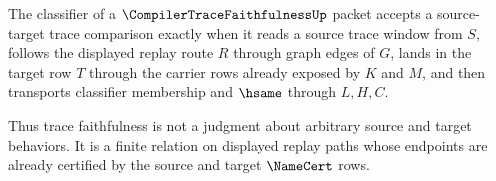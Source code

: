 \begin{definition}
\label{def:compiler-trace-faithfulness-classifier}
The classifier of a $\CompilerTraceFaithfulnessUp$ packet accepts a source-target trace comparison exactly when it reads a source trace window from $S$, follows the displayed replay route $R$ through graph edges of $G$, lands in the target row $T$ through the carrier rows already exposed by $K$ and $M$, and then transports classifier membership and $\hsame$ through $L,H,C$.

Thus trace faithfulness is not a judgment about arbitrary source and target behaviors. It is a finite relation on displayed replay paths whose endpoints are already certified by the source and target $\NameCert$ rows.
\end{definition}

